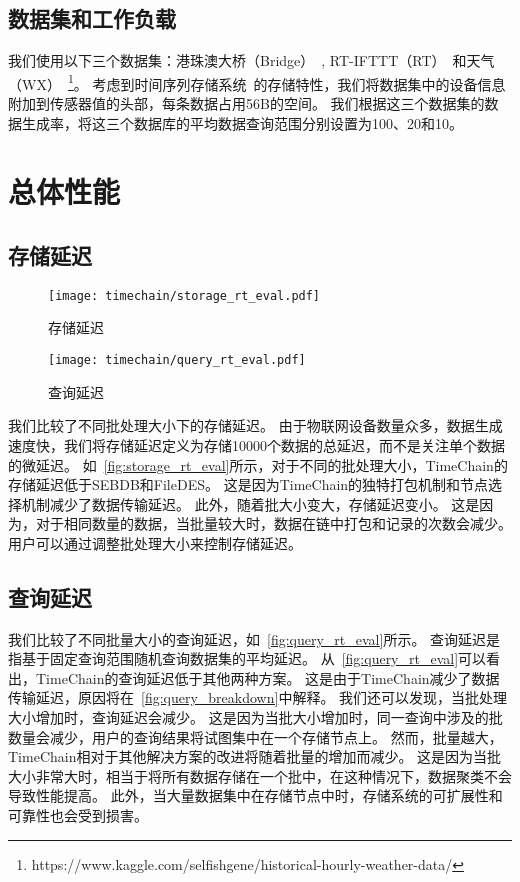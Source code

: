\subsection{数据集和工作负载}
我们使用以下三个数据集：港珠澳大桥（Bridge）~\cite{zhang2023edge}, RT-IFTTT（RT）~\cite{heo2017rt}和天气（WX）~\footnote{https://www.kaggle.com/selfishgene/historical-hourly-weather-data/}。
考虑到时间序列存储系统~\cite{naqvi2017time}的存储特性，我们将数据集中的设备信息附加到传感器值的头部，每条数据占用56B的空间。
我们根据这三个数据集的数据生成率，将这三个数据库的平均数据查询范围分别设置为100、20和10。

\section{总体性能}

\subsection{存储延迟}
\begin{figure*}[t]
    \centering
	\begin{minipage}{0.48\linewidth}
        \centering
        \texttt{[image: timechain/storage\_rt\_eval.pdf]}
        \caption{存储延迟}
        \label{fig:storage_rt_eval}
    \end{minipage}
    \quad
    \begin{minipage}{0.48\linewidth}
        \centering
        \texttt{[image: timechain/query\_rt\_eval.pdf]}
        \caption{查询延迟}
        \label{fig:query_rt_eval}
	\end{minipage}
\end{figure*}
我们比较了不同批处理大小下的存储延迟。
由于物联网设备数量众多，数据生成速度快，我们将存储延迟定义为存储10000个数据的总延迟，而不是关注单个数据的微延迟。
如~\autoref{fig:storage_rt_eval}所示，对于不同的批处理大小，TimeChain的存储延迟低于SEBDB和FileDES。
这是因为TimeChain的独特打包机制和节点选择机制减少了数据传输延迟。
此外，随着批大小变大，存储延迟变小。
这是因为，对于相同数量的数据，当批量较大时，数据在链中打包和记录的次数会减少。
用户可以通过调整批处理大小来控制存储延迟。

\subsection{查询延迟}
我们比较了不同批量大小的查询延迟，如~\autoref{fig:query_rt_eval}所示。
查询延迟是指基于固定查询范围随机查询数据集的平均延迟。
从~\autoref{fig:query_rt_eval}可以看出，TimeChain的查询延迟低于其他两种方案。
这是由于TimeChain减少了数据传输延迟，原因将在~\autoref{fig:query_breakdown}中解释。
我们还可以发现，当批处理大小增加时，查询延迟会减少。
这是因为当批大小增加时，同一查询中涉及的批数量会减少，用户的查询结果将试图集中在一个存储节点上。
然而，批量越大，TimeChain相对于其他解决方案的改进将随着批量的增加而减少。
这是因为当批大小非常大时，相当于将所有数据存储在一个批中，在这种情况下，数据聚类不会导致性能提高。
此外，当大量数据集中在存储节点中时，存储系统的可扩展性和可靠性也会受到损害。

